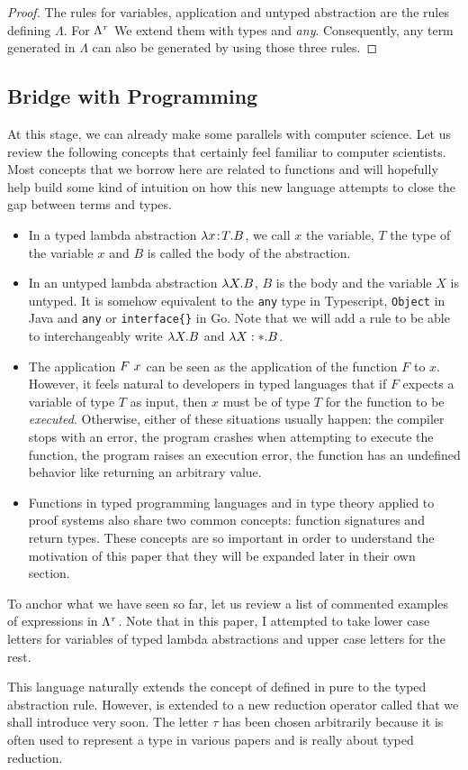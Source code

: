 \begin{proof}
    The rules for variables, application and untyped abstraction are the rules defining $\Lambda$. For $\Lambda^{\tau}$ We extend them with types and \textit{any}. Consequently, any term generated in $\Lambda$ can also be generated by using those three rules.
\end{proof}

\subsection{Bridge with Programming}

At this stage, we can already make some parallels with computer science. Let us review the following concepts that certainly feel familiar to computer scientists. Most concepts that we borrow here are related to functions and will hopefully help build some kind of intuition on how this new language attempts to close the gap between terms and types. 
\begin{itemize}
    \item In a typed lambda abstraction $\tabs x:T.B$, we call $x$ the variable, $T$ the type of the variable $x$ and $B$ is called the body of the abstraction.
    \item In an untyped lambda abstraction $\lambda X.B$, $B$ is the body and the variable $X$ is untyped. It is somehow equivalent to the \texttt{any} type in Typescript, \texttt{Object} in Java and \texttt{any} or \texttt{interface\{\}} in Go. Note that we will add a rule to be able to interchangeably write $\lambda X.B$ and $\lambda X:*.B$. 
    \item The application $F\ x$ can be seen as the application of the function $F$ to $x$. However, it feels natural to developers in typed languages that if $F$ expects a variable of type $T$ as input, then $x$ must be of type $T$ for the function to be \textit{executed}. Otherwise, either of these situations usually happen: the compiler stops with an error, the program crashes when attempting to execute the function, the program raises an execution error, the function has an undefined behavior like returning an arbitrary value.
    \item Functions in typed programming languages and in type theory applied to proof systems also share two common concepts: function signatures and return types. These concepts are so important in order to understand the motivation of this paper that they will be expanded later in their own section.
\end{itemize}

To anchor what we have seen so far, let us review a list of commented examples of expressions in $\Lambda^{\tau}$.
Note that in this paper, I attempted to take lower case letters for variables of typed lambda abstractions and upper case letters for the rest.

This language naturally extends the concept of \alphaequivalence defined in pure \lambdacalc to the typed abstraction rule. However, \betareduction is extended to a new reduction operator called \taureduction that we shall introduce very soon. The letter $\tau$ has been chosen arbitrarily because it is often used to represent a type in various papers and \taureduction is really about typed reduction.

